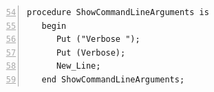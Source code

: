 \lstset{language=Ada, caption=Show Command Line Argument}
\begin{lstlisting}[frame=single, numbers=left, numbersep=5pt, firstnumber= 54]
   procedure ShowCommandLineArguments is
   begin
      Put ("Verbose ");
      Put (Verbose);
      New_Line;
   end ShowCommandLineArguments;
\end{lstlisting}
